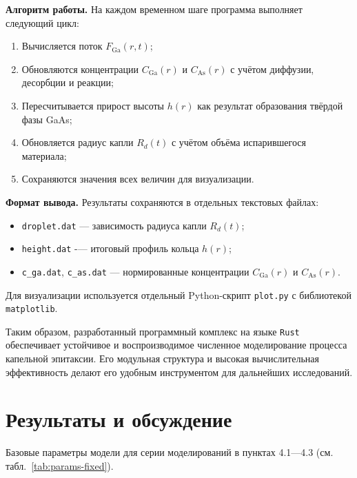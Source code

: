 \documentclass[14pt,oneside]{extarticle}
\begin{document}
\textbf{Алгоритм работы.} На каждом временном шаге программа выполняет следующий цикл:

\begin{enumerate}
    \item Вычисляется поток $F_{\mathrm{Ga}}(r, t)$;
    \item Обновляются концентрации $C_{\mathrm{Ga}}(r)$ и $C_{\mathrm{As}}(r)$ с учётом диффузии, десорбции и реакции;
    \item Пересчитывается прирост высоты $h(r)$ как результат образования твёрдой фазы GaAs;
    \item Обновляется радиус капли $R_d(t)$ с учётом объёма испарившегося материала;
    \item Сохраняются значения всех величин для визуализации.
\end{enumerate}

\textbf{Формат вывода.} Результаты сохраняются в отдельных текстовых файлах:

\begin{itemize}
    \item \texttt{droplet.dat} — зависимость радиуса капли $R_d(t)$;
    \item \texttt{height.dat} -— итоговый профиль кольца $h(r)$;
    \item \texttt{c\_ga.dat}, \texttt{c\_as.dat} — нормированные концентрации $C_{\mathrm{Ga}}(r)$ и $C_{\mathrm{As}}(r)$.
\end{itemize}

Для визуализации используется отдельный Python-скрипт \texttt{plot.py} с библиотекой \texttt{matplotlib}.

Таким образом, разработанный программный комплекс на языке \texttt{Rust} обеспечивает устойчивое и воспроизводимое численное моделирование процесса капельной эпитаксии. Его модульная структура и высокая вычислительная эффективность делают его удобным инструментом для дальнейших исследований.

\pagebreak
\section{Результаты и обсуждение}

Базовые параметры модели для серии моделирований в пунктах 4.1—4.3 (см. табл.~\ref{tab:params-fixed}).
\end{document}
